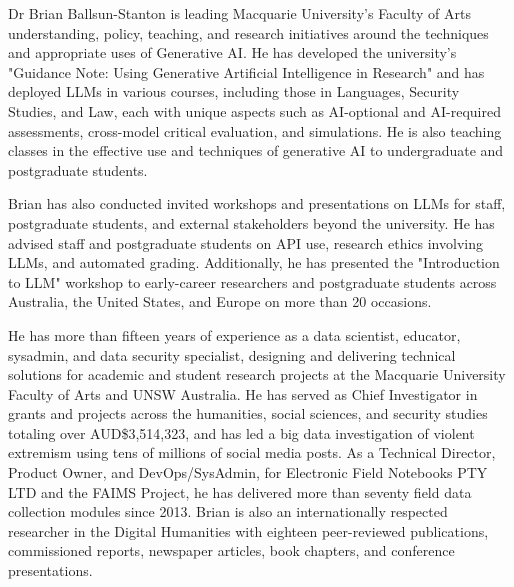 
Dr Brian Ballsun-Stanton is leading Macquarie University's Faculty of Arts understanding, policy, teaching, and research initiatives around the techniques and appropriate uses of Generative AI. He has developed the university's "Guidance Note: Using Generative Artificial Intelligence in Research" and has deployed LLMs in various courses, including those in Languages, Security Studies, and Law, each with unique aspects such as AI-optional and AI-required assessments, cross-model critical evaluation, and simulations. He is also teaching classes in the effective use and techniques of generative AI to undergraduate and postgraduate students.

Brian has also conducted invited workshops and presentations on LLMs for staff, postgraduate students, and external stakeholders beyond the university. He has advised staff and postgraduate students on API use, research ethics involving LLMs, and automated grading. Additionally, he has presented the "Introduction to LLM" workshop to early-career researchers and postgraduate students across Australia, the United States, and Europe on more than 20 occasions.

He has more than fifteen years of experience as a data scientist, educator, sysadmin, and data security specialist, designing and delivering technical solutions for academic and student research projects at the Macquarie University Faculty of Arts and UNSW Australia. He has served as Chief Investigator in grants and projects across the humanities, social sciences, and security studies totaling over AUD\$3,514,323, and has led a big data investigation of violent extremism using tens of millions of social media posts. As a Technical Director, Product Owner, and DevOps/SysAdmin, for Electronic Field Notebooks PTY LTD and the FAIMS Project, he has delivered more than seventy field data collection modules since 2013. Brian is also an internationally respected researcher in the Digital Humanities with eighteen peer-reviewed publications, commissioned reports, newspaper articles, book chapters, and conference presentations.



